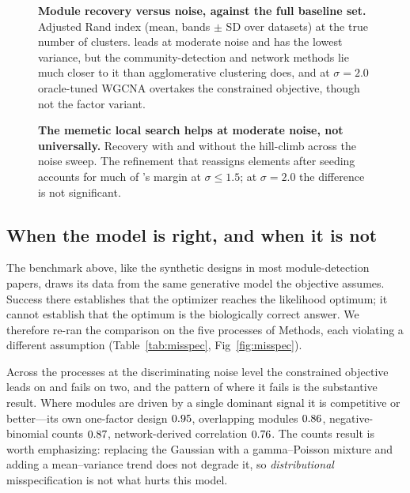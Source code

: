 \begin{figure}[!h]
\caption{\textbf{Module recovery versus noise, against the full baseline set.}
Adjusted Rand index (mean, bands $\pm$ SD over \NSeeds{} datasets) at the true
number of clusters. \tool{} leads at moderate noise and has the lowest variance,
but the community-detection and network methods lie much closer to it than
agglomerative clustering does, and at $\sigma=2.0$ oracle-tuned WGCNA overtakes the constrained objective, though not the factor variant.}
\label{fig:perfnoise}
\end{figure}

\begin{figure}[!h]
\caption{\textbf{The memetic local search helps at moderate noise, not
universally.} Recovery with and without the hill-climb across the noise sweep.
The refinement that reassigns elements after seeding accounts for much of
\tool{}'s margin at $\sigma\le1.5$; at $\sigma=2.0$ the difference is not
significant.}
\label{fig:ablation}
\end{figure}





\subsection*{When the model is right, and when it is not}
The benchmark above, like the synthetic designs in most module-detection papers,
draws its data from the same generative model the objective assumes. Success
there establishes that the optimizer reaches the likelihood optimum; it cannot
establish that the optimum is the biologically correct answer. We therefore
re-ran the comparison on the five processes of Methods, each violating a
different assumption (Table~\ref{tab:misspec}, Fig~\ref{fig:misspec}).

Across the \MisspecTotal{} processes at the discriminating noise level the
constrained objective leads on \MisspecWins{} and fails on two, and the pattern of
where it fails is the substantive result. Where modules are driven by a single
dominant signal it is competitive or better---its own one-factor design
$0.95{}$, overlapping modules $0.86{}$,
negative-binomial counts $0.87{}$, network-derived correlation
$0.76{}$. The counts result is worth emphasizing: replacing the
Gaussian with a gamma--Poisson mixture and adding a mean--variance trend does not
degrade it, so \emph{distributional} misspecification is not what hurts this
model.

